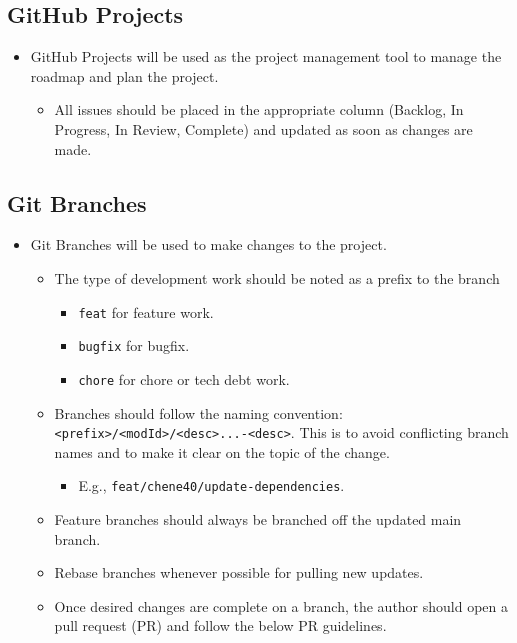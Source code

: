 \documentclass{article}
\begin{document}
\subsection{GitHub Projects}
\begin{itemize}
    \item GitHub Projects will be used as the project management tool to manage
    the roadmap and plan the project.
    \begin{itemize}
        \item All issues should be placed in the appropriate column (Backlog, In
        Progress, In Review, Complete) and updated as soon as changes are made.
    \end{itemize}
\end{itemize}

\subsection{Git Branches}
\begin{itemize}
    \item Git Branches will be used to make changes to the project.
    \begin{itemize}
        \item The type of development work should be noted as a prefix to the
        branch
        \begin{itemize}
            \item \texttt{feat} for feature work.
            \item \texttt{bugfix} for bugfix.
            \item \texttt{chore} for chore or tech debt work.
        \end{itemize}
        \item Branches should follow the naming convention:
        \texttt{<prefix>/<modId>/<desc>...-<desc>}. This is to avoid conflicting
        branch names and to make it clear on the topic of the change.
        \begin{itemize}
            \item E.g., \texttt{feat/chene40/update-dependencies}.
        \end{itemize}
        \item Feature branches should always be branched off the updated main
        branch.
        \item Rebase branches whenever possible for pulling new updates.
        \item Once desired changes are complete on a branch, the author should
        open a pull request (PR) and follow the below PR guidelines.
    \end{itemize}
\end{itemize}
\end{document}
